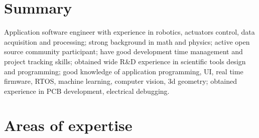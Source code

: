 \vspace*{-15mm}

\section{Summary}

Application software engineer with experience in robotics, actuators control, data acquisition and processing; strong background in math and physics; active open source community participant; have good development time management and project tracking skills; obtained wide R\&D experience in scientific tools design and programming; good knowledge of application programming, UI, real time firmware, RTOS, machine learning, computer vision, 3d geometry; obtained experience in PCB development, electrical debugging.

\vspace*{-4mm}
\section{Areas of expertise}

\vspace*{-4mm}
